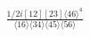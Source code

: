 \documentclass[varwidth, border=5pt]{standalone}
\begin{document}
\begin{my}
$\begin{gathered}
\scriptscriptstyle\frac{1/2i[12][23]\langle46\rangle^4}{\langle16\rangle\langle34\rangle\langle45\rangle\langle56\rangle}
\end{gathered}$
\end{my}
\end{document}
